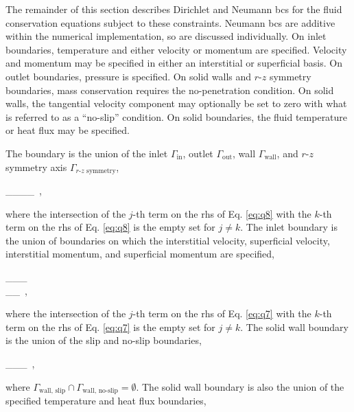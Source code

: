 The remainder of this section describes Dirichlet and Neumann \glspl{bc} for the fluid conservation equations subject to these constraints. Neumann \glspl{bc} are additive within the numerical implementation, so are discussed individually. On inlet boundaries, temperature and either velocity or momentum are specified. Velocity and momentum may be specified in either an interstitial or superficial basis. On outlet boundaries, pressure is specified. On solid walls and \(r\)-\(z\) symmetry boundaries, mass conservation requires the no-penetration condition. On solid walls, the tangential velocity component may optionally be set to zero with what is referred to as a ``no-slip'' condition. On solid boundaries, the fluid temperature or heat flux may be specified. 

The boundary is the union of the inlet \(\Gamma_\text{in}\), outlet \(\Gamma_\text{out}\), wall \(\Gamma_\text{wall}\), and $r$-$z$ symmetry axis \(\Gamma_\text{$r$-$z$ symmetry}\),

\beq
\label{eq:q8}
\Gamma\equiv\Gamma_\cup\Gamma_\cup\Gamma_\cup\Gamma_\ ,
\eeq

\noindent where the intersection of the \(j\)-th term on the \gls{rhs} of Eq. \eqref{eq:q8} with the \(k\)-th term on the \gls{rhs} of Eq. \eqref{eq:q8} is the empty set for \(j\neq k\). The inlet boundary is the union of boundaries on which the interstitial velocity, superficial velocity, interstitial momentum, and superficial momentum are specified,

\beqa
\label{eq:q7}
\Gamma_\equiv\Gamma_\cup\Gamma_\ \cup\hspace{1cm}\\
\Gamma_\cup\Gamma_\ ,
\eeqa

\noindent where the intersection of the \(j\)-th term on the \gls{rhs} of Eq. \eqref{eq:q7} with the \(k\)-th term on the \gls{rhs} of Eq. \eqref{eq:q7} is the empty set for \(j\neq k\). The solid wall boundary is the union of the slip and no-slip boundaries, 

\beq
\Gamma_\equiv\Gamma_\cup\Gamma_\ ,
\eeq

\noindent where \(\Gamma_\text{wall, slip}\cap\Gamma_\text{wall, no-slip}=\emptyset\). The solid wall boundary is also the union of the specified temperature and heat flux boundaries,

